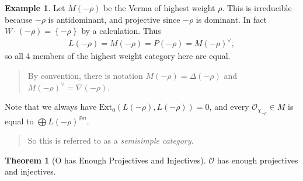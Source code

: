 \documentclass[11pt]{scrartcl}
\theoremstyle{definition}
\theoremstyle{theorem}
\newtheorem{theorem}{Theorem}[section]
\theoremstyle{proof}
\theoremstyle{definition}
\theoremstyle{break}
\newtheorem{example}{Example}[section]
\theoremstyle{problem}
\newcommand{\ext}[0]{\text{Ext}}
\newcommand{\dual}[0]{^\vee}
\newcommand{\OO}[0]{{\mathcal{O}}}
\newcommand{\theset}[1]{\left\{{#1}\right\}}
\begin{document}
\begin{example}

Let \(M(-\rho)\) be the Verma of highest weight \(\rho\). This is
irreducible because \(-\rho\) is antidominant, and projective since
\(-\rho\) is dominant. In fact \(W\cdot(-\rho) = \theset{-\rho}\) by a
calculation. Thus
\begin{align*}L(-\rho) = M(-\rho) = P(-\rho) = M(-\rho)\dual,\end{align*}
so all 4 members of the highest weight category here are
equal.\end{example}

\begin{quote}
By convention, there is notation \(M(-\rho) = \Delta(-\rho)\) and
\(M(-\rho)\dual = \nabla(-\rho)\).
\end{quote}

Note that we always have \(\ext_0(L(-\rho), L(-\rho)) = 0\), and every
\(\OO_{\chi_{-\rho}} \in M\) is equal to
\(\bigoplus L(-\rho)^{\oplus n}\).

\begin{quote}
So this is referred to as a \emph{semisimple category}.
\end{quote}

\begin{theorem}[O has Enough Projectives and Injectives]

\(\OO\) has enough projectives and injectives.\end{theorem}
\end{document}
